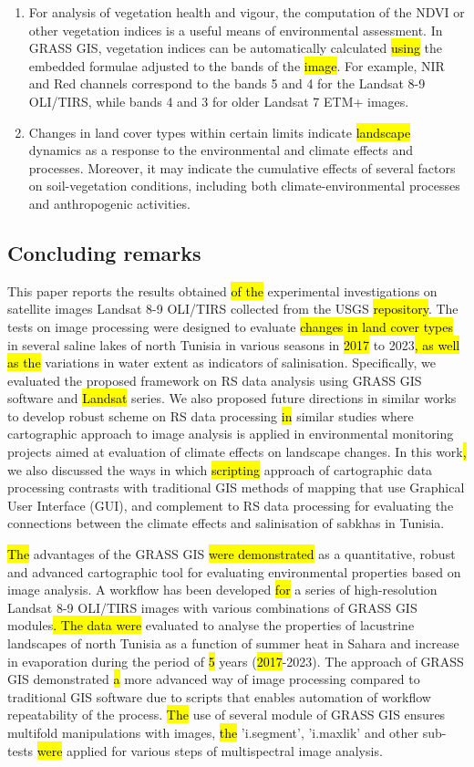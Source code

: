 \documentclass[land,article,submit,pdftex,moreauthors]{Definitions/mdpi}
\begin{document}
\begin{enumerate}
	\item For analysis of vegetation health and vigour, the computation of the NDVI or other vegetation indices is a useful means of environmental assessment. In GRASS GIS, vegetation indices can be automatically calculated \hl{using} the embedded formulae adjusted to the bands of the \hl{image}. For example, NIR and Red channels correspond to the bands 5 and 4 for the Landsat 8-9 OLI/TIRS, while bands 4 and 3 for older Landsat 7 ETM+ images.
	\item Changes in land cover types within certain limits indicate \hl{landscape} dynamics as a response to the environmental and climate effects and processes. Moreover, it may indicate the cumulative effects of several factors on soil-vegetation conditions, including both climate-environmental processes and anthropogenic activities.
\end{enumerate}

\subsection{Concluding remarks}

This paper reports the results obtained \hl{of the} experimental investigations on satellite images Landsat 8-9 OLI/TIRS collected from the USGS \hl{repository}. The tests on image processing were designed to evaluate\hl{ changes in land cover types} in several saline lakes of north Tunisia in various seasons in \hl{2017} to 2023\hl{, as well as the }variations in water extent as indicators of salinisation. Specifically, we evaluated the proposed framework on RS data analysis using GRASS GIS software and \hl{Landsat} series. We also proposed future directions in similar works to develop robust scheme on RS data processing\hl{ in} similar studies where cartographic approach to image analysis is applied in environmental monitoring projects aimed at evaluation of climate effects on landscape changes. In this work\hl{, }we also discussed the ways in which\hl{ scripting} approach of cartographic data processing contrasts with traditional GIS methods of mapping that use Graphical User Interface (GUI), and complement to RS data processing for evaluating the connections between the climate effects and salinisation of sabkhas in Tunisia. 

\hl{The} advantages of the GRASS GIS \hl{were demonstrated }as a quantitative, robust and advanced cartographic tool for evaluating environmental properties based on image analysis. A workflow has been developed \hl{for} a series of high-resolution Landsat 8-9 OLI/TIRS images with various combinations of GRASS GIS modules\hl{. The data were }evaluated to analyse the properties of lacustrine landscapes of north Tunisia as a function of summer heat in Sahara and increase in evaporation during the period of \hl{5} years (\hl{2017}-2023). The approach of GRASS GIS demonstrated \hl{a }more advanced way of image processing compared to traditional GIS software due to scripts that enables automation of workflow repeatability of the process. \hl{The} use of several module of GRASS GIS ensures multifold manipulations with images, \hl{the} 'i.segment', 'i.maxlik' and other sub-tests\hl{ were} applied for various steps of multispectral image analysis. 
\end{document}
